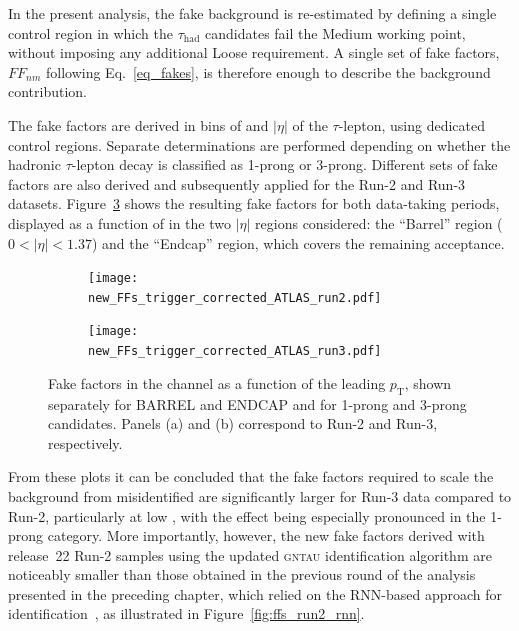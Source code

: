 In the present analysis, the fake background is re-estimated by defining a single control region in which the $\tau_{\mathrm{had}}$ candidates fail the Medium working point, without imposing any additional Loose requirement. A single set of fake factors, $FF_{nm}$ following Eq.~\ref{eq_fakes}, is therefore enough to describe the background contribution. 

The fake factors are derived in bins of \pt and $|\eta|$ of the $\tau$-lepton, using dedicated \taulephad control regions. Separate determinations are performed depending on whether the hadronic $\tau$-lepton decay is classified as 1-prong or 3-prong. Different sets of fake factors are also derived and subsequently applied for the Run-2 and Run-3 datasets. Figure~\ref{fig:ff_run2_run3} shows the resulting fake factors for both data-taking periods, displayed as a function of \pt in the two $|\eta|$ regions considered: the ``Barrel'' region ($0<|\eta|<1.37$) and the ``Endcap'' region, which covers the remaining acceptance.
\begin{figure}[htbp]
    \centering
    \begin{subfigure}[b]{0.49\textwidth}
      \centering
      \texttt{[image: new\_FFs\_trigger\_corrected\_ATLAS\_run2.pdf]}
      \caption{}
      \label{fig:ff_run2}
    \end{subfigure}
    \hfill
    \begin{subfigure}[b]{0.49\textwidth}
      \centering
      \texttt{[image: new\_FFs\_trigger\_corrected\_ATLAS\_run3.pdf]}
      \caption{}
      \label{fig:ff_run3}
    \end{subfigure}
    \caption{
      Fake factors in the \tauhadhad channel as a function of the leading $p_{\mathrm{T}}$,
      shown separately for BARREL and ENDCAP and for 1-prong and 3-prong candidates.
      Panels (a) and (b) correspond to Run-2
      and Run-3, respectively.
    }
    \label{fig:ff_run2_run3}
  \end{figure}
From these plots it can be concluded that the fake factors required to scale the background from misidentified \tauhad are significantly larger for Run-3 data compared to Run-2, particularly at low \pt, with the effect being especially pronounced in the 1-prong category. More importantly, however, the new fake factors derived with release~22 Run-2 samples using the updated \textsc{gntau} identification algorithm are noticeably smaller than those obtained in the previous round of the analysis presented in the preceding chapter, which relied on the RNN-based approach for \tauhad identification~\cite{serhat_tesis}, as illustrated in Figure~\ref{fig:ffs_run2_rnn}.  
